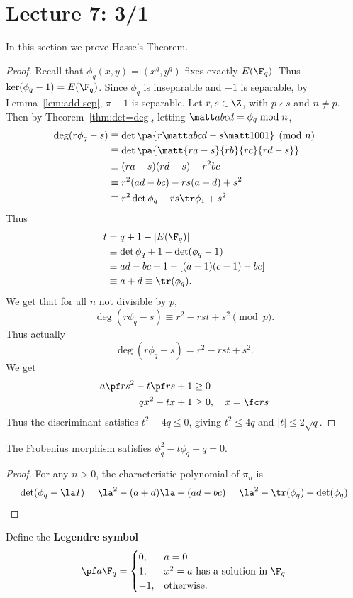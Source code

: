 \section{Lecture 7: 3/1}
In this section we prove Hasse's Theorem.
\begin{proof}
Recall that $\phi_q(x,y)=(x^q,y^q)$ fixes exactly $E(\F_q)$. Thus $\ker(\phi_q-1)=E(\F_q)$. Since $\phi_q$ is inseparable and $-1$ is separable,  by Lemma~\ref{lem:add-sep}, $\pi-1$ is separable. Let $r,s\in \Z$, with $p\nmid s$ and $n\ne p$. Then by Theorem~\ref{thm:det=deg}, letting $\matt abcd=\phi_q\bmod n$,
\begin{align*}
\deg(r\phi_q-s)&\equiv \det\pa{
r\matt abcd - s\matt 1001
}\pmod n\\
&\equiv \det\pa{\matt{ra-s}{rb}{rc}{rd-s}}\\
&\equiv (ra-s)(rd-s)-r^2bc\\
&\equiv r^2(ad-bc)-rs(a+d)+s^2\\
&\equiv r^2\det\phi_q - rs\tr\phi_1+s^2.
\end{align*}
Thus
\begin{align*}
t&=q+1-|E(\F_q)|\\
&\equiv \det \phi_q%
+1-\det(\phi_q-1)\\
&\equiv ad-bc +1 - [(a-1)(c-1)-bc]\\
&\equiv a+d\equiv\tr(\phi_q)%
.
\end{align*}
We get that for all $n$ not divisible by $p$, 
\[
\deg(r\phi_q-s)\equiv r^2-rst+s^2\pmod p.
\]
Thus actually
\[
\deg(r\phi_q-s)= r^2-rst+s^2.
\]
We get
\begin{align*}
a\pf rs^2 -t\pf rs+1&\ge 0\\
qx^2-tx+1&\ge 0,\quad x=\fc rs\\
\end{align*}
Thus the discriminant satisfies $t^2-4q\le 0$, giving $t^2\le 4q$ and $|t|\le 2\sqrt q$.
\end{proof}
\begin{cor}The Frobenius morphism satisfies
$\phi_q^2-t\phi_q+q=0$.
\end{cor}
\begin{proof}
For any $n>0$, the characteristic polynomial of $\pi_n$ is 
\[
\det(\phi_q-\la I)=\la^2-(a+d)\la +(ad-bc)=\la^2-\tr(\phi_q)+\det(\phi_q)%
\]
\end{proof}
\begin{df}
Define the \textbf{Legendre symbol}
\[
\pf a{\F_q}=\begin{cases}
0,&a=0\\
1,&x^2=a\text{ has a solution in }\F_q\\
-1,&\text{otherwise.}
\end{cases}
\]
\end{df}
